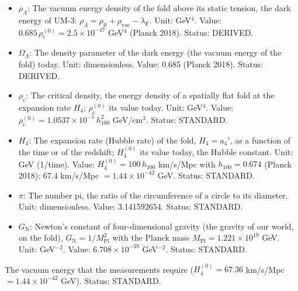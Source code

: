 \documentclass[
  10pt,
]{article}
\providecommand{\tightlist}{%
  \setlength{\itemsep}{0pt}\setlength{\parskip}{0pt}}
\begin{document}
\begin{itemize}
\tightlist
\item
  \(\rho_\Lambda\): The vacuum energy density of the fold above its
  static tension, the dark energy of UM-3:
  \(\rho_\Lambda = \rho_{\mathrm{ff}} + \rho_{\mathrm{vac}} - \lambda_{\mathrm{F}}\).
  Unit: GeV\(^4\). Value:
  \(0.685\,\rho_{\mathrm{c}}^{(0)} = 2.5\times10^{-47}\) GeV\(^4\)
  (Planck 2018). Status: DERIVED.
\item
  \(\Omega_\Lambda\): The density parameter of the dark energy (the
  vacuum energy of the fold) today. Unit: dimensionless. Value: 0.685
  (Planck 2018). Status: DERIVED.
\item
  \(\rho_{\mathrm{c}}\): The critical density, the energy density of a
  spatially flat fold at the expansion rate \(H_4\);
  \(\rho_{\mathrm{c}}^{(0)}\) its value today. Unit: GeV\(^4\). Value:
  \(\rho_{\mathrm{c}}^{(0)} = 1.0537\times10^{-5}\,h_{100}^2\)
  GeV/cm\(^3\). Status: STANDARD.
\item
  \(H_4\): The expansion rate (Hubble rate) of the fold, \(H_4 = a_4'\),
  as a function of the time or of the redshift; \(H_4^{(0)}\) its value
  today, the Hubble constant. Unit: GeV (1/time). Value:
  \(H_4^{(0)} = 100\,h_{100}\) km/s/Mpc with \(h_{100} = 0.674\) (Planck
  2018): 67.4 km/s/Mpc \(= 1.44\times10^{-42}\) GeV. Status: STANDARD.
\item
  \(\pi\): The number pi, the ratio of the circumference of a circle to
  its diameter. Unit: dimensionless. Value: 3.141592654. Status:
  STANDARD.
\item
  \(G_{\mathrm{N}}\): Newton's constant of four-dimensional gravity (the
  gravity of our world, on the fold),
  \(G_{\mathrm{N}} = 1/M_{\mathrm{Pl}}^2\) with the Planck mass
  \(M_{\mathrm{Pl}} = 1.221\times10^{19}\) GeV. Unit: GeV\(^{-2}\).
  Value: \(6.708\times10^{-39}\) GeV\(^{-2}\). Status: STANDARD.
\end{itemize}

The vacuum energy that the measurements require (\(H_4^{(0)} = 67.36\)
km/s/Mpc \(= 1.44\times10^{-42}\) GeV). Status: STANDARD.
\end{document}
